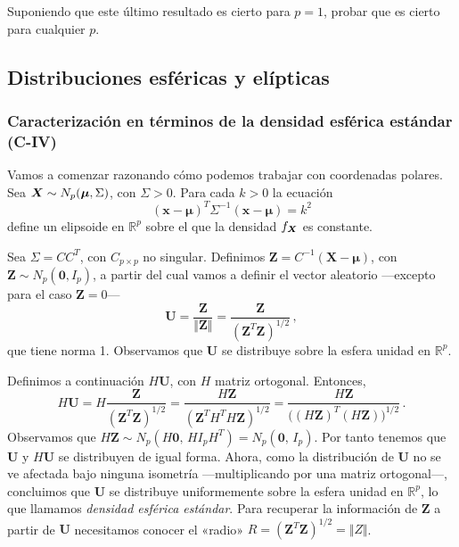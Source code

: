 \begin{ejer}
  Suponiendo que este último resultado es cierto para $p=1$, probar que es cierto para cualquier $p$.
\end{ejer}

\subsection{Distribuciones esféricas y elípticas}

\subsubsection{Caracterización en términos de la densidad esférica estándar (C-IV)}

Vamos a comenzar razonando cómo podemos trabajar con coordenadas polares. Sea $\boldsymbol{X} \sim N_p(\boldsymbol \mu, \Sigma)$, con $\Sigma > 0$. Para cada $k > 0$ la ecuación \[(\boldsymbol x - \boldsymbol \mu)^T \Sigma^{-1}(\boldsymbol x - \boldsymbol \mu) = k^2\] define un elipsoide en $\mathbb R^p$ sobre el que la densidad $f_{\boldsymbol{X}}$ es constante. 

Sea $\Sigma = CC^T$, con $C_{p\times p}$ no singular. Definimos $\boldsymbol Z = C^{-1}(\boldsymbol X - \boldsymbol \mu)$, con $\boldsymbol Z \sim N_p(\boldsymbol 0, I_p)$, a partir del cual vamos a definir el vector aleatorio —excepto para el caso $\boldsymbol Z = 0$— \[\boldsymbol U = \frac{\boldsymbol Z}{\Vert \boldsymbol Z \Vert} = \frac{\boldsymbol Z}{(\boldsymbol Z^T \boldsymbol Z)^{1/2}}\,,\] que tiene norma 1. Observamos que $\boldsymbol U$ se distribuye sobre la esfera unidad en $\mathbb R^p$.

Definimos a continuación $H \boldsymbol U$, con $H$ matriz ortogonal. Entonces, \[
  H \boldsymbol U = H \frac{\boldsymbol Z}{\left(\boldsymbol Z^T \boldsymbol Z\right)^{1/2}} = \frac{H\boldsymbol Z}{\left(\boldsymbol Z^T H^T H\boldsymbol Z\right)^{1/2}} = \frac{H\boldsymbol Z}{\Big((H\boldsymbol Z)^T (H\boldsymbol Z)\Big)^{1/2}}\,.
\] Observamos que $H \boldsymbol Z \sim N_p(H \boldsymbol 0,\, H I_pH^T) = N_p(\boldsymbol 0,\, I_p)$. Por tanto tenemos que $\boldsymbol U$ y $H \boldsymbol U$ se distribuyen de igual forma. Ahora, como la distribución de $\boldsymbol U$ no se ve afectada bajo ninguna isometría —multiplicando por una matriz ortogonal—, concluimos que $\boldsymbol U$ se distribuye uniformemente sobre la esfera unidad en $\mathbb R^p$, lo que llamamos \textit{densidad esférica estándar}. Para recuperar la información de $\boldsymbol Z$ a partir de $\boldsymbol U$ necesitamos conocer el «radio» $R = (\boldsymbol Z^T \boldsymbol Z)^{1/2} = \Vert Z \Vert$.

